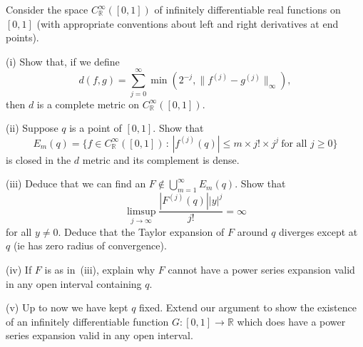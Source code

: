 \begin{exercise}\label{E;smooth non-analytic}\label{C2.7} 
Consider the space
$C_{\mathbb R}^{\infty}([0,1])$ of infinitely
differentiable real functions on $[0,1]$ (with appropriate conventions
about left and right derivatives at end points).

(i) Show that, if we define
\[d(f,g)=\sum_{j=0}^{\infty}\min(2^{-j},\|f^{(j)}-g^{(j)}\|_{\infty}),\]
then $d$ is a complete metric on $C_{\mathbb R}^{\infty}([0,1])$.

(ii) Suppose $q$ is a point of $[0,1]$. Show that
\[E_{m}(q)=\{f\in C_{\mathbb R}^{\infty}([0,1])
\,:\,|f^{(j)}(q)|\leq m \times j!\times j^{j}
\ \text{for all $j\geq 0$}\}\]
is closed in the $d$ metric and its complement is dense.

(iii) Deduce that we can find an $F\notin\bigcup_{m=1}^{\infty}E_{m}(q)$.
Show that 
\[\limsup_{j\rightarrow\infty}\frac{|F^{(j)}(q)||y|^{j}}{j!}=\infty\]
for all $y\neq 0$. Deduce that the Taylor expansion of $F$ around $q$
diverges except at $q$  (ie has zero radius of convergence).

(iv) If $F$ is as in~(iii), explain why $F$ cannot have a power series
expansion valid in any open interval containing $q$.

(v) Up to now we have kept $q$ fixed. Extend our argument to show the
existence of an infinitely differentiable 
function $G:[0,1]\rightarrow{\mathbb R}$
which does have a power series
expansion valid in any open interval.
\end{exercise}



